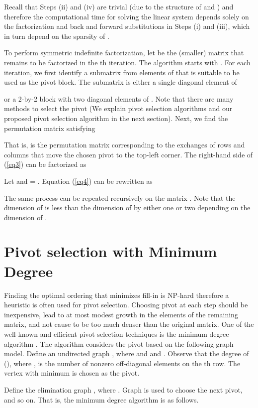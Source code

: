 \documentclass{article}
\begin{document}
Recall that Steps (ii) and (iv) are trivial (due to the structure of  and ) and therefore the computational time for solving the linear system depends solely on the factorization and back and forward substitutions in Steps (i) and (iii), which in turn depend on the sparsity of .  

To perform symmetric indefinite factorization, let  be the (smaller) matrix that remains to be factorized in the th iteration. The algorithm starts with . 
For each iteration, we first identify a submatrix  from elements of  that is suitable to be used as the pivot block.
The submatrix  is either a single diagonal element of   

 or a 2-by-2 block with two diagonal elements of   
. 
Note that there are many methods to select the pivot (We explain pivot selection algorithms and our proposed pivot selection algorithm in the next section).  Next, we find the permutation matrix  satisfying

That is,  is the permutation matrix corresponding to the exchanges of rows and columns that move the chosen pivot to the top-left corner.  The right-hand side of (\ref{eq3}) can be factorized as

Let  and  = . Equation (\ref{eq4}) can be rewritten as

The same process can be repeated recursively on the matrix . Note that the dimension of   is less than the dimension of  by either one or two depending on the dimension of .




\section{Pivot selection with Minimum Degree} \label{sec3}
Finding the optimal ordering that minimizes fill-in is NP-hard \cite{MFNP} therefore a heuristic is often used for pivot selection. 
Choosing pivot at each step should be inexpensive, lead to at most modest growth in the elements of the remaining matrix, and not cause  to be too much denser than the original matrix.  One of the well-known and efficient pivot selection techniques is the minimum degree algorithm \cite{MD1, MD2, MD3}.
The algorithm considers the pivot based on the following graph model. 
Define an undirected graph , where  and  and .
Observe that the degree of  (), where , is the number of nonzero off-diagonal elements on the th row.
The vertex  with minimum  is chosen as the pivot.

Define the elimination graph , where .
Graph  is used to choose the next pivot, and so on.
That is, the minimum degree algorithm is as follows. 
\end{document}
